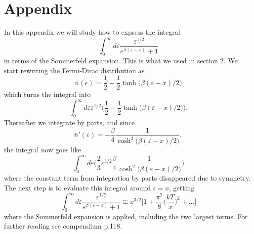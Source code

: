 \documentclass[norsk,a4paper,12pt]{article}
\begin{document}
\newpage
\section{Appendix}
In this appendix we will study how to express the integral
\begin{equation}
\int_0^{\infty}d\varepsilon\frac{\varepsilon^{1/2}}{e^{\beta(\varepsilon-x)}+1}
\end{equation}
in terms of the Sommerfeld expansion. This is what we used in section 2. We start rewriting the Fermi-Dirac distribution as
\begin{equation}
\bar{n}(\epsilon)=\frac{1}{2}-\frac{1}{2}\tanh\big(\beta(\varepsilon-x)/2\big)
\end{equation}
which turns the integral into
\begin{equation}
\int_0^{\infty}d\varepsilon\varepsilon^{1/2}\bigg(\frac{1}{2}-\frac{1}{2}\tanh\big(\beta(\varepsilon-x)/2\big)\bigg).
\end{equation}
Thereafter we integrate by parts, and since
\begin{equation}
\bar{n}'(\varepsilon)=-\frac{\beta}{4}\frac{1}{\cosh^2\big(\beta(\varepsilon-x)/2\big)},
\end{equation}
the integral now goes like
\begin{equation}
\int_0^{\infty}d\varepsilon\bigg(\frac{2}{3}\varepsilon^{3/2}\frac{\beta}{4}\frac{1}{\cosh^2\big(\beta(\varepsilon-x)/2\big)}\bigg)
\end{equation}
where the constant term from integration by parts disappeared due to symmetry. The next step is to evaluate this integral around $\epsilon=x$, getting
\begin{equation}
\int_0^{\infty}d\varepsilon\frac{\varepsilon^{1/2}}{e^{\beta(\varepsilon-x)}+1}\cong x^{3/2}\bigg[1+\frac{\pi^2}{8}\Big(\frac{kT}{x}\Big)^2+\hdots\bigg]
\end{equation}
where the Sommerfeld expansion is applied, including the two largest terms. For further reading see compendium p.118.
\end{document}
